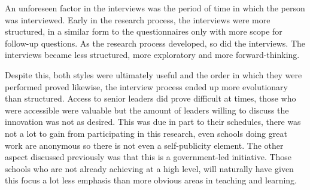An unforeseen factor in the interviews was the period of time in which the person was interviewed. Early in the research process, the interviews were more structured, in a similar form to the questionnaires only with more scope for follow-up questions. As the research process developed, so did the interviews. The interviews became less structured, more exploratory and more forward-thinking.

Despite this, both styles were ultimately useful and the order in which they were performed proved likewise, the interview process ended up more evolutionary than structured. Access to senior leaders did prove difficult at times, those who were accessible were valuable but the amount of leaders willing to discuss the innovation was not as desired. This was due in part to their schedules, there was not a lot to gain from participating in this research, even schools doing great work are anonymous so there is not even a self-publicity element. The other aspect discussed previously was that this is a government-led initiative. Those schools who are not already achieving at a high level, will naturally have given this focus a lot less emphasis than more obvious areas in teaching and learning. 


